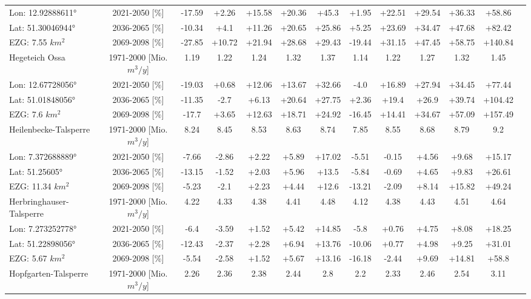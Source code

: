 \begin{longtable}{@{\extracolsep{\fill}}lc|ccccc||cccccc}
\cline{2-13} 
Lon: 12.92888611° & 2021-2050 [\%]  & -17.59 & +2.26 & +15.58 & +20.36 & +45.3 & +1.95 & +22.51 & +29.54 & +36.33 & +58.86 & \\ 
Lat: 51.30046944° & 2036-2065 [\%]  & -10.34 & +4.1 & +11.26 & +20.65 & +25.86 & +5.25 & +23.69 & +34.47 & +47.68 & +82.42 & \\ 
EZG: 7.55 $km^2$ & 2069-2098 [\%]  & -27.85 & +10.72 & +21.94 & +28.68 & +29.43 & -19.44 & +31.15 & +47.45 & +58.75 & +140.84 & \\ 
\hline 
Hegeteich Ossa & 1971-2000 [Mio. $m^3/y$]  & 1.19 & 1.22 & 1.24 & 1.32 & 1.37 & 1.14 & 1.22 & 1.27 & 1.32 & 1.45 & \\ 
\cline{2-13} 
Lon: 12.67728056° & 2021-2050 [\%]  & -19.03 & +0.68 & +12.06 & +13.67 & +32.66 & -4.0 & +16.89 & +27.94 & +34.45 & +77.44 & \\ 
Lat: 51.01848056° & 2036-2065 [\%]  & -11.35 & -2.7 & +6.13 & +20.64 & +27.75 & +2.36 & +19.4 & +26.9 & +39.74 & +104.42 & \\ 
EZG: 7.6 $km^2$ & 2069-2098 [\%]  & -17.7 & +3.65 & +12.63 & +18.71 & +24.92 & -16.45 & +14.41 & +34.67 & +57.09 & +157.49 & \\ 
\hline 
Heilenbecke-Talsperre & 1971-2000 [Mio. $m^3/y$]  & 8.24 & 8.45 & 8.53 & 8.63 & 8.74 & 7.85 & 8.55 & 8.68 & 8.79 & 9.2 & \\ 
\cline{2-13} 
Lon: 7.372688889° & 2021-2050 [\%]  & -7.66 & -2.86 & +2.22 & +5.89 & +17.02 & -5.51 & -0.15 & +4.56 & +9.68 & +15.17 & \\ 
Lat: 51.25605° & 2036-2065 [\%]  & -13.15 & -1.52 & +2.03 & +5.96 & +13.5 & -5.84 & -0.69 & +4.65 & +9.83 & +26.61 & \\ 
EZG: 11.34 $km^2$ & 2069-2098 [\%]  & -5.23 & -2.1 & +2.23 & +4.44 & +12.6 & -13.21 & -2.09 & +8.14 & +15.82 & +49.24 & \\ 
\hline 
Herbringhauser-Talsperre & 1971-2000 [Mio. $m^3/y$]  & 4.22 & 4.33 & 4.38 & 4.41 & 4.48 & 4.12 & 4.38 & 4.43 & 4.51 & 4.64 & \\ 
\cline{2-13} 
Lon: 7.273252778° & 2021-2050 [\%]  & -6.4 & -3.59 & +1.52 & +5.42 & +14.85 & -5.8 & +0.76 & +4.75 & +8.08 & +18.25 & \\ 
Lat: 51.22898056° & 2036-2065 [\%]  & -12.43 & -2.37 & +2.28 & +6.94 & +13.76 & -10.06 & +0.77 & +4.98 & +9.25 & +31.01 & \\ 
EZG: 5.67 $km^2$ & 2069-2098 [\%]  & -5.54 & -2.58 & +1.52 & +5.67 & +13.16 & -16.18 & -2.44 & +9.69 & +14.81 & +58.8 & \\ 
\hline 
Hopfgarten-Talsperre & 1971-2000 [Mio. $m^3/y$]  & 2.26 & 2.36 & 2.38 & 2.44 & 2.8 & 2.2 & 2.33 & 2.46 & 2.54 & 3.11 & \\ 

\end{longtable}
